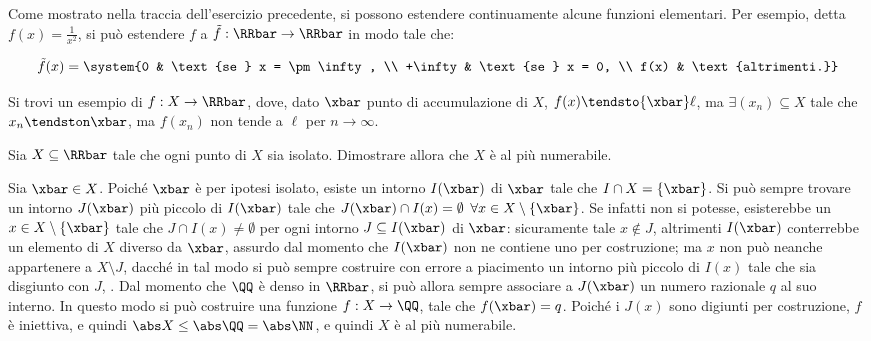 \documentclass[11pt]{article}
\begin{document}
	\begin{remark} Come mostrato nella traccia dell'esercizio precedente,
		si possono estendere continuamente alcune funzioni elementari.
		Per esempio, detta $f(x) = \frac{1}{x^2}$, si può estendere $f$
		a $\tilde f : \RRbar \to \RRbar$ in modo tale che:
		
		\[ \tilde f(x) = \system {0 & \text{se } x = \pm \infty, \\ +\infty & \text{se } x = 0, \\ f(x) & \text{altrimenti.}} \]
	\end{remark}

	
	\begin{exercise}
		Si trovi un esempio di $f : X \to \RRbar$, dove, dato $\xbar$ punto
		di accumulazione di $X$, $f(x) \tendsto{\xbar} \ell$, ma
		$\exists (x_n) \subseteq X$ tale che $x_n \tendston \xbar$, ma
		$f(x_n)$ non tende a $\ell$ per $n \to \infty$.
	\end{exercise}

	\begin{solution}
		
	\end{solution}

	\begin{exercise}
		Sia $X \subseteq \RRbar$ tale che ogni punto di $X$ sia isolato.
		Dimostrare allora che $X$ è al più numerabile.
	\end{exercise}

	\begin{solution}
		Sia $\xbar \in X$. Poiché $\xbar$ è per ipotesi isolato, esiste
		un intorno $I(\xbar)$ di $\xbar$ tale che $I \cap X = \{\xbar\}$. Si può
		sempre trovare un intorno $J(\xbar)$ più piccolo di $I(\xbar)$ tale
		che $J(\xbar) \cap I(x) = \emptyset$ $\forall x \in X \setminus \{\xbar\}$.
		Se infatti non si potesse, esisterebbe un $x \in X \setminus \{\xbar\}$ tale che $J \cap I(x) \neq \emptyset$ per ogni
		intorno $J \subseteq I(\xbar)$ di $\xbar$: sicuramente tale $x \notin J$,
		altrimenti $I(\xbar)$ conterrebbe un elemento di $X$ diverso
		da $\xbar$, assurdo dal momento che $I(\xbar)$ non ne contiene uno
		per costruzione; ma $x$ non può neanche appartenere a $X \setminus J$,
		dacché in tal modo si può sempre costruire con errore a piacimento
		un intorno più piccolo di $I(x)$ tale che sia disgiunto con $J$,
		\Lightning. Dal momento che $\QQ$ è denso in $\RRbar$, si può allora
		sempre associare a $J(\xbar)$ un numero razionale $q$ al suo interno.
		In questo modo si può costruire una funzione $f : X \to \QQ$,
		tale che $f(\xbar) = q$. Poiché i $J(x)$ sono digiunti per costruzione,
		$f$ è iniettiva, e quindi $\abs X \leq \abs \QQ = \abs \NN$, e quindi
		$X$ è al più numerabile. %
	\end{solution}
\end{document}
